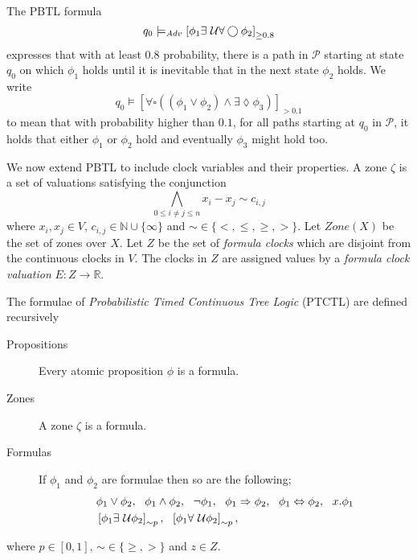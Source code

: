 \begin{ex}
The PBTL formula
\[
q_{0}\models_{Adv} \left[\phi_{1}\exists\ \mathcal{U}\forall\bigcirc \phi_{2}\right]_{\geq 0.8}
\]
expresses that with at least $0.8$ probability, there is a path in $\mathcal{P}$ starting at state $q_{0}$ on which $\phi_{1}$ holds until it is inevitable that in the next state $\phi_{2}$ holds.
We write
\[
q_{0}\models\left[\forall\square((\phi_{1}\lor\phi_{2})\land\exists\lozenge\phi_{3})\right]_{>0.1}
\]
to mean that with probability higher than $0.1$, for all paths starting at $q_{0}$ in $\mathcal{P}$, it holds that either $\phi_{1}$ or $\phi_{2}$ hold and eventually $\phi_{3}$ might hold too.
\end{ex}
We now extend PBTL to include clock variables and their properties.
A zone $\zeta$ is a set of valuations satisfying the conjunction
\[
\bigwedge_{0\leq i\neq j\leq n} x_{i}-x_{j}\sim c_{i,j}
\]
where $x_{i},x_{j}\in V$, $c_{i,j}\in\mathbb{N}\cup\{\infty\}$ and $\sim\in\{<,\leq,\geq,>\}$.
Let $Zone(X)$ be the set of zones over $X$.
Let $Z$ be the set of \emph{formula clocks} which are disjoint from the continuous clocks in $V$. The clocks in $Z$ are assigned values by a \emph{formula clock valuation} $E : Z \rightarrow \mathbb{R}$.

\begin{defi}
The formulae of \emph{Probabilistic Timed Continuous Tree Logic} (PTCTL) are defined recursively
\begin{description}
    \item[Propositions]{Every atomic proposition $\phi$ is a formula.}
    \item[Zones]{A zone $\zeta$ is a formula.}
    \item[Formulas]{If $\phi_{1}$ and $\phi_{2}$ are formulae then so are the following;
    \begin{align*}
        & \phi_{1} \lor \phi_{2},\ \ \phi_{1} \land \phi_{2}, \ \ \lnot \phi_{1}, \ \ \phi_{1} \Rightarrow \phi_{2},\ \ \phi_{1} \Leftrightarrow \phi_{2},\ \ x.\phi_{1} \\
        & \left[\phi_{1} \exists\until \phi_{2}\right]_{\sim p}, \ \
          \left[\phi_{1} \forall\until \phi_{2}\right]_{\sim p},
        \end{align*}}
\end{description}
where $p\in[0,1]$, $\sim\in\{\geq,>\}$ and $z\in Z$.
\end{defi}

